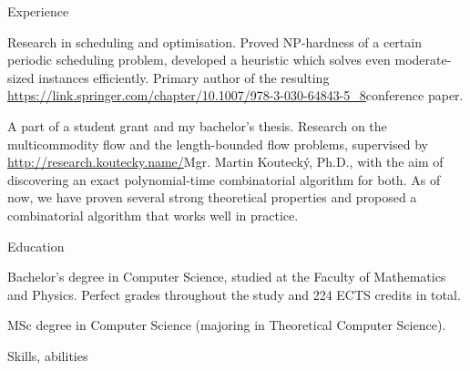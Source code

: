 \newif\ifdoublecolumn
\doublecolumnfalse




\newdimen\hei
\hei=1.5cm

\vskip 3mm
\doublecolumns

\sekce Experience

%
Research in scheduling and optimisation. Proved NP-hardness of a certain
periodic scheduling problem, developed a heuristic which solves even
moderate-sized instances efficiently. Primary author of the resulting \url{https://link.springer.com/chapter/10.1007/978-3-030-64843-5_8}{conference paper}.

%
A part of a student grant and my bachelor's thesis. Research on the
multicommodity flow and the length-bounded flow problems, supervised by
\url{http://research.koutecky.name/}{Mgr. Martin Koutecký, Ph.D.}, with the aim
of discovering an exact polynomial-time combinatorial algorithm for both. As of now, we have proven
several strong theoretical properties and proposed a combinatorial algorithm
that works well in practice.

\sekce Education


Bachelor's degree in Computer Science, studied at the Faculty of Mathematics
and Physics. Perfect grades throughout the study and 224 ECTS credits in total.


MSc degree in Computer Science (majoring in Theoretical Computer Science).

\sekce Skills, abilities

